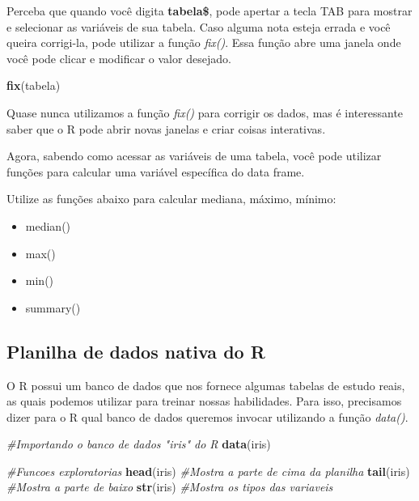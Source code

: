 \documentclass[
]{book}
\newenvironment{Shaded}{\begin{snugshade}}{\end{snugshade}}
\newcommand{\CommentTok}[1]{\textcolor[rgb]{0.56,0.35,0.01}{\textit{#1}}}
\newcommand{\FunctionTok}[1]{\textcolor[rgb]{0.13,0.29,0.53}{\textbf{#1}}}
\newcommand{\NormalTok}[1]{#1}
\newcommand{\SpecialCharTok}[1]{\textcolor[rgb]{0.81,0.36,0.00}{\textbf{#1}}}
\providecommand{\tightlist}{%
  \setlength{\itemsep}{0pt}\setlength{\parskip}{0pt}}
\begin{document}
Perceba que quando você digita \textbf{tabela\$}, pode apertar a tecla TAB para mostrar e selecionar as variáveis de sua tabela. Caso alguma nota esteja errada e você queira corrigi-la, pode utilizar a função \emph{fix()}. Essa função abre uma janela onde você pode clicar e modificar o valor desejado.

\begin{Shaded}
\begin{Highlighting}[]

\FunctionTok{fix}\NormalTok{(tabela)}
\end{Highlighting}
\end{Shaded}

Quase nunca utilizamos a função \emph{fix()} para corrigir os dados, mas é interessante saber que o R pode abrir novas janelas e criar coisas interativas.

Agora, sabendo como acessar as variáveis de uma tabela, você pode utilizar funções para calcular uma variável específica do data frame.

\begin{Shaded}
\end{Shaded}

Utilize as funções abaixo para calcular mediana, máximo, mínimo:

\begin{itemize}
\tightlist
\item
  median()
\item
  max()
\item
  min()
\item
  summary()
\end{itemize}

\hypertarget{planilha-de-dados-nativa-do-r}{%
\subsection{Planilha de dados nativa do R}\label{planilha-de-dados-nativa-do-r}}

O R possui um banco de dados que nos fornece algumas tabelas de estudo reais, as quais podemos utilizar para treinar nossas habilidades. Para isso, precisamos dizer para o R qual banco de dados queremos invocar utilizando a função \emph{data()}.

\begin{Shaded}
\begin{Highlighting}[]
\CommentTok{\#Importando o banco de dados "iris" do R}
\FunctionTok{data}\NormalTok{(iris)}

\CommentTok{\#Funcoes exploratorias}
\FunctionTok{head}\NormalTok{(iris) }\CommentTok{\#Mostra a parte de cima da planilha }
\FunctionTok{tail}\NormalTok{(iris) }\CommentTok{\#Mostra a parte de baixo}
\FunctionTok{str}\NormalTok{(iris)  }\CommentTok{\#Mostra os tipos das variaveis}
\end{Highlighting}
\end{Shaded}
\end{document}
